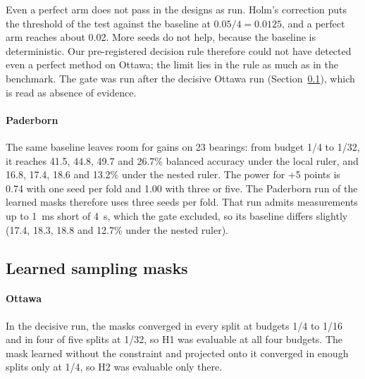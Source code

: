 Even a perfect arm does not pass in the designs as run. Holm's correction puts the threshold of the
test against the baseline at $0.05/4 = 0.0125$, and a perfect arm reaches about 0.02. More seeds do
not help, because the baseline is deterministic. Our pre-registered decision rule therefore could
not have detected even a perfect method on Ottawa; the limit lies in the rule as much as in the
benchmark. The gate was run after the decisive Ottawa run (Section~\ref{sec:res-masks}), which is
read as absence of evidence.

\paragraph{Paderborn} The same baseline leaves room for gains on 23 bearings: from budget 1/4 to
1/32, it reaches 41.5, 44.8, 49.7 and 26.7\% balanced accuracy under the local ruler, and 16.8,
17.4, 18.6 and 13.2\% under the nested ruler. The power for +5 points is 0.74 with one seed per fold
and 1.00 with three or five. The Paderborn run of the learned masks therefore uses three seeds per
fold. That run admits measurements up to 1~ms short of 4~s, which the gate excluded, so its
baseline differs slightly (17.4, 18.3, 18.8 and 12.7\% under the nested ruler).

\begin{table}[!tbp]
  \centering
  \caption{Power of the H1 decision rule to detect a planted arm that is truly better than the
  classical baseline, under the optimistic rule, for 200 simulated replications per cell (20 for
  the perfect arm). On Ottawa the row ``each record once'' uses four folds stratified by race and a
  synthetic baseline that spreads its misses over all clusters, the most favourable case for the
  test. The pre-registered criterion is a power of at least 0.80 at +5 points.}
  \label{tab:power}
  \small
  
\end{table}

\subsection{Learned sampling masks}
\label{sec:res-masks}

\paragraph{Ottawa} In the decisive run, the masks converged in every split at budgets 1/4 to 1/16
and in four of five splits at 1/32, so H1 was evaluable at all four budgets. The mask learned
without the constraint and projected onto it converged in enough splits only at 1/4, so H2 was
evaluable only there.

